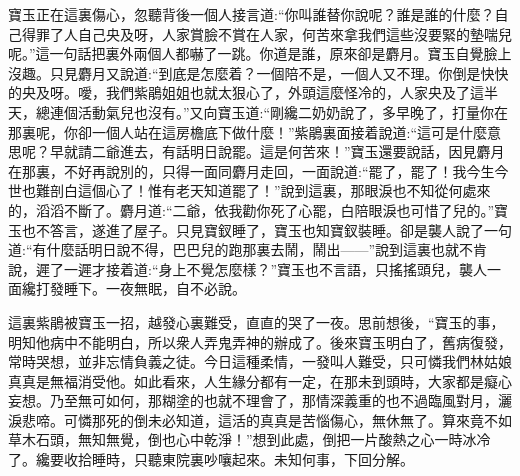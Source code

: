 \begin{parag}
    寶玉正在這裏傷心，忽聽背後一個人接言道:“你叫誰替你說呢？誰是誰的什麼？自己得罪了人自己央及呀，人家賞臉不賞在人家，何苦來拿我們這些沒要緊的墊喘兒呢。”這一句話把裏外兩個人都嚇了一跳。你道是誰，原來卻是麝月。寶玉自覺臉上沒趣。只見麝月又說道:“到底是怎麼着？一個陪不是，一個人又不理。你倒是快快的央及呀。噯，我們紫鵑姐姐也就太狠心了，外頭這麼怪冷的，人家央及了這半天，總連個活動氣兒也沒有。”又向寶玉道:“剛纔二奶奶說了，多早晚了，打量你在那裏呢，你卻一個人站在這房檐底下做什麼！”紫鵑裏面接着說道:“這可是什麼意思呢？早就請二爺進去，有話明日說罷。這是何苦來！”寶玉還要說話，因見麝月在那裏，不好再說別的，只得一面同麝月走回，一面說道:“罷了，罷了！我今生今世也難剖白這個心了！惟有老天知道罷了！”說到這裏，那眼淚也不知從何處來的，滔滔不斷了。麝月道:“二爺，依我勸你死了心罷，白陪眼淚也可惜了兒的。”寶玉也不答言，遂進了屋子。只見寶釵睡了，寶玉也知寶釵裝睡。卻是襲人說了一句道:“有什麼話明日說不得，巴巴兒的跑那裏去鬧，鬧出——”說到這裏也就不肯說，遲了一遲才接着道:“身上不覺怎麼樣？”寶玉也不言語，只搖搖頭兒，襲人一面纔打發睡下。一夜無眠，自不必說。
\end{parag}


\begin{parag}
    這裏紫鵑被寶玉一招，越發心裏難受，直直的哭了一夜。思前想後，“寶玉的事，明知他病中不能明白，所以衆人弄鬼弄神的辦成了。後來寶玉明白了，舊病復發，常時哭想，並非忘情負義之徒。今日這種柔情，一發叫人難受，只可憐我們林姑娘真真是無福消受他。如此看來，人生緣分都有一定，在那未到頭時，大家都是癡心妄想。乃至無可如何，那糊塗的也就不理會了，那情深義重的也不過臨風對月，灑淚悲啼。可憐那死的倒未必知道，這活的真真是苦惱傷心，無休無了。算來竟不如草木石頭，無知無覺，倒也心中乾淨！”想到此處，倒把一片酸熱之心一時冰冷了。纔要收拾睡時，只聽東院裏吵嚷起來。未知何事，下回分解。
\end{parag}